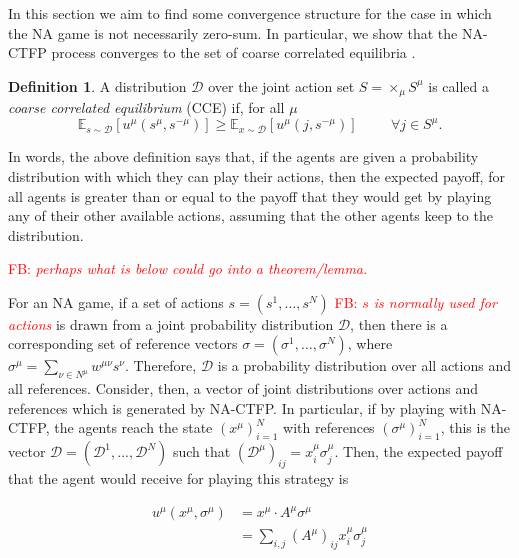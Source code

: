 \documentclass{article}
\theoremstyle{definition}
\newtheorem{definition}{Definition}
\newcommand{\fb}[1]{\textcolor{red}{FB: \textit{#1}}}
\newcommand{\wmunu}{w^{\mu \nu}}
\newcommand{\xmu}{x^{\mu}}
\newcommand{\refmu}{\sigma^{\mu}}
\begin{document}
  In this section we aim to find some convergence structure for the
  case in which the NA game is not necessarily zero-sum. In
  particular, we show that the NA-CTFP process converges to the set of
  coarse correlated equilibria \cite{}.
  \begin{definition}
    A distribution $\mathcal{D}$ over the joint action set $S =
    \times_\mu S^\mu$ is called a \emph{coarse correlated equilibrium}
    (CCE) if, for all $\mu$
    \begin{equation}
      \mathbb{E}_{s \sim \mathcal{D}}[u^\mu (s^\mu, s^{- \mu})] \geq
      \mathbb{E}_{x \sim \mathcal{D}}[u^\mu (j, s^{-
          \mu})] \hspace{1cm} \forall j \in S^\mu.
    \end{equation}
  \end{definition}

  In words, the above definition says that, if the agents are given a
  probability distribution with which they can play their actions, then
  the expected payoff, for all agents is greater than or equal to the
  payoff that they would get by playing any of their other available
  actions, assuming that the other agents keep to the distribution.

  \fb{perhaps what is below could go into a theorem/lemma.}
  
  For an NA game, if a set of actions $s = (s^1, \ldots, s^N)$ \fb{$s$ is normally used for actions} is
  drawn from a joint probability distribution $\mathcal{D}$, then
  there is a corresponding set of reference vectors $\sigma =
  (\sigma^1, \ldots, \sigma^N)$, where $\sigma^\mu = \sum_{\nu \in
    N^\mu} \wmunu s^\nu$.  Therefore, $\mathcal{D}$ is a probability
  distribution over all actions and all references.  Consider, then, a
  vector of joint distributions over actions and references which is
  generated by NA-CTFP. In particular, if by playing with NA-CTFP, the
  agents reach the state $(\xmu)_{i = 1}^N$ with references
  $(\refmu)_{i = 1}^N$, this is the vector $\mathcal{D} =
  (\mathcal{D}^1, ..., \mathcal{D}^N)$ such that
  $(\mathcal{D}^\mu)_{ij} = \xmu_i \refmu_j$. Then, the expected
  payoff that the agent would receive for playing this strategy is

  \begin{align}
    u^\mu(\xmu, \refmu) & = \xmu \cdot A^\mu \refmu \nonumber \\
    & = \sum_{i, j} (A^\mu)_{ij} \xmu_i \refmu_j \nonumber 
  \end{align}
\end{document}
